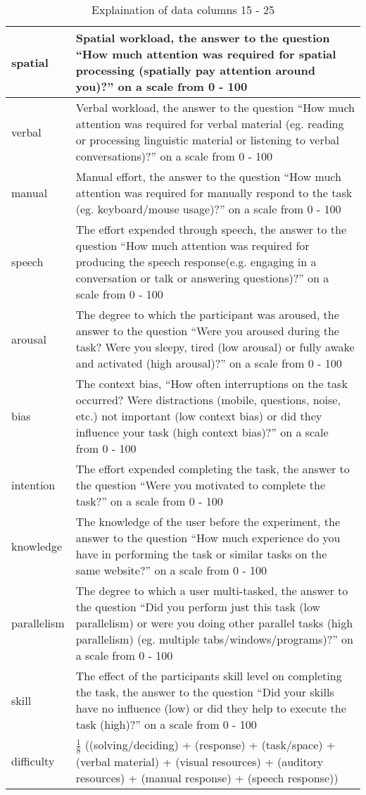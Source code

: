 \begin{table}[]
\centering
\begin{tabular}{|l|p{10cm}|}
\hline
spatial & Spatial workload, the answer to the question ``How much attention was required for spatial processing (spatially pay attention around you)?'' on a scale from 0 - 100 \\ \hline
verbal & Verbal workload, the answer to the question ``How much attention was required for verbal material (eg. reading or processing linguistic material or listening to verbal conversations)?'' on a scale from 0 - 100 \\ \hline
manual & Manual effort, the answer to the question ``How much attention was required for manually respond to the task (eg. keyboard/mouse usage)?'' on a scale from 0 - 100 \\ \hline
speech & The effort expended through speech, the answer to the question ``How much attention was required for producing the speech response(e.g. engaging in a conversation or talk or answering questions)?'' on a scale from 0 - 100 \\ \hline
arousal & The degree to which the participant was aroused, the answer to the question ``Were you aroused during the task? Were you sleepy, tired (low arousal) or fully awake and activated (high arousal)?'' on a scale from 0 - 100 \\ \hline
bias & The context bias, ``How often interruptions on the task occurred? Were distractions (mobile, questions, noise, etc.) not important (low context bias) or did they influence your task (high context bias)?'' on a scale from 0 - 100 \\ \hline
intention &  The effort expended completing the task, the answer to the question ``Were you motivated to complete the task?'' on a scale from 0 - 100 \\ \hline
knowledge & The knowledge of the user before the experiment, the answer to the question ``How much experience do you have in performing the task or similar tasks on the same website?'' on a scale from 0 - 100 \\ \hline
parallelism & The degree to which a user multi-tasked, the answer to the question ``Did you perform just this task (low parallelism) or were you doing other parallel tasks (high parallelism) (eg. multiple tabs/windows/programs)?'' on a scale from 0 - 100 \\ \hline
skill & The effect of the participants skill level on completing the task, the answer to the question ``Did your skills have no influence (low) or did they help to execute the task (high)?'' on a scale from 0 - 100 \\ \hline
difficulty & \( \frac{1}{8} \) ((solving/deciding) + (response) + (task/space) + (verbal material) + (visual resources) + (auditory resources) + (manual response) + (speech response)) \\ \hline
\end{tabular}
\caption{Explaination of data columns 15 - 25}
\label{tab:my_label}
\end{table} 